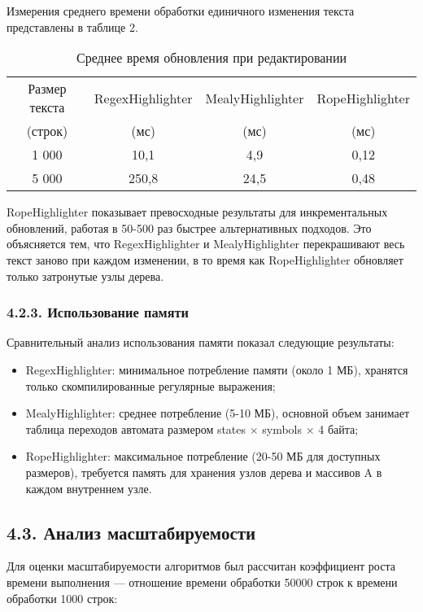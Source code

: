 Измерения среднего времени обработки единичного изменения текста представлены в таблице 2.

\begin{table}[h]
\centering
\caption{Среднее время обновления при редактировании}
\begin{tabular}{|c|c|c|c|}
\hline
Размер текста & RegexHighlighter & MealyHighlighter & RopeHighlighter \\
(строк) & (мс) & (мс) & (мс) \\
\hline
1 000 & 10,1 & 4,9 & 0,12 \\
5 000 & 250,8 & 24,5 & 0,48 \\
\hline
\end{tabular}
\end{table}

RopeHighlighter показывает превосходные результаты для инкрементальных обновлений, работая в 50-500 раз быстрее альтернативных подходов. Это объясняется тем, что RegexHighlighter и MealyHighlighter перекрашивают весь текст заново при каждом изменении, в то время как RopeHighlighter обновляет только затронутые узлы дерева.

\subsubsection*{4.2.3. Использование памяти}

Сравнительный анализ использования памяти показал следующие результаты:

\begin{itemize}
\item RegexHighlighter: минимальное потребление памяти (около 1 МБ), хранятся только скомпилированные регулярные выражения;
\item MealyHighlighter: среднее потребление (5-10 МБ), основной объем занимает таблица переходов автомата размером states × symbols × 4 байта;
\item RopeHighlighter: максимальное потребление (20-50 МБ для доступных размеров), требуется память для хранения узлов дерева и массивов A в каждом внутреннем узле.
\end{itemize}

\subsection*{4.3. Анализ масштабируемости}

Для оценки масштабируемости алгоритмов был рассчитан коэффициент роста времени выполнения — отношение времени обработки 50000 строк к времени обработки 1000 строк:

